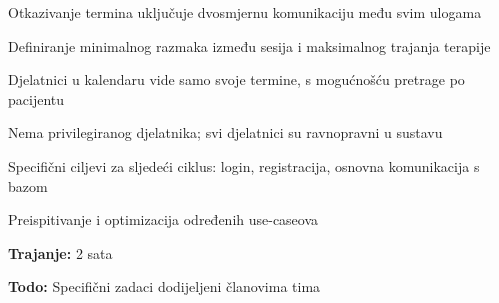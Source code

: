 \begin{packed_enum}
\begin{packed_item}
\begin{packed_item}
                \item Otkazivanje termina uključuje dvosmjernu komunikaciju među svim ulogama
                \item Definiranje minimalnog razmaka između sesija i maksimalnog trajanja terapije
                \item Djelatnici u kalendaru vide samo svoje termine, s mogućnošću pretrage po pacijentu
                \item Nema privilegiranog djelatnika; svi djelatnici su ravnopravni u sustavu
                \item Specifični ciljevi za sljedeći ciklus: login, registracija, osnovna komunikacija s bazom
                \item Preispitivanje i optimizacija određenih use-caseova
            \end{packed_item}
        \item \textbf{Trajanje:} 2 sata
        \item \textbf{Todo:} Specifični zadaci dodijeljeni članovima tima
    \end{packed_item}

\vspace{30pt}


\end{packed_enum}
